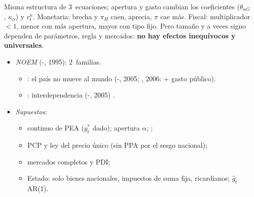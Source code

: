 \documentclass{article}
\begin{document}
\begin{columnas}
\begin{ideaclave}
Misma estructura de 3~ecuaciones; apertura y gasto cambian los coeficientes ($\theta_{\alpha G}$, $\kappa_\alpha$) y $r^n_t$. Monetaria: brecha y $\pi_H$ caen, aprecia, $\pi$ cae más. Fiscal: multiplicador $<1$, menor con más apertura, mayor con tipo fijo. Pero tamaño y a veces signo dependen de parámetros, regla y mercados: \textbf{no hay efectos inequívocos y universales}.
\end{ideaclave}

\begin{itemize}
\item \emph{NOEM} (-, 1995): 2~familias.
  \begin{itemize}
  \item {}: el país no mueve al mundo (-, 2005; , 2006: + gasto público).
  \item {}: interdependencia (-, 2005) .
  \end{itemize}
\item \emph{Supuestos}:
  \begin{itemize}
  \item continuo de PEA ($y^*_t$ dado); apertura $\alpha$; ;
  \item PCP y ley del precio único (sin PPA por el sesgo nacional);
  \item mercados completos y PDI;
  \item Estado: solo bienes nacionales, impuestos de suma fija, ricardianos; $\hat g_t$ AR(1).
  \end{itemize}
\end{itemize}


\end{columnas}
\end{document}
